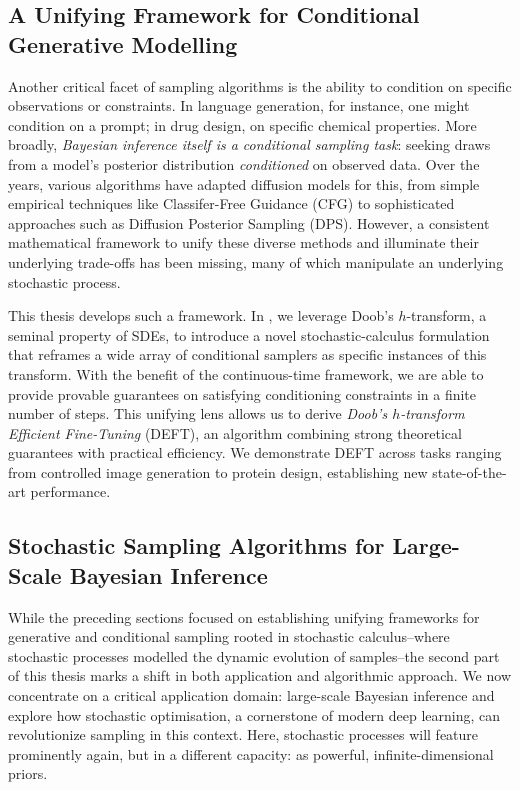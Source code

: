 \subsection{A Unifying Framework for Conditional Generative Modelling}

Another critical facet of sampling algorithms is the ability to condition on specific observations or constraints. In language generation, for instance, one might condition on a prompt; in drug design, on specific chemical properties. More broadly, \emph{Bayesian inference itself is a conditional sampling task}: seeking draws from a model's posterior distribution \emph{conditioned} on observed data. Over the years, various algorithms have adapted diffusion models for this, from simple empirical techniques like Classifer-Free Guidance (CFG) to sophisticated approaches such as Diffusion Posterior Sampling (DPS). However, a consistent mathematical framework to unify these diverse methods and illuminate their underlying trade-offs has been missing, many of which manipulate an underlying stochastic process.

This thesis develops such a framework. In , we leverage Doob’s \(h\)-transform, a seminal property of SDEs, to introduce a novel stochastic-calculus formulation that reframes a wide array of conditional samplers as specific instances of this transform. With the benefit of the continuous-time framework, we are able to provide provable guarantees on satisfying conditioning constraints in a finite number of steps. This unifying lens allows us to derive \emph{Doob’s \(h\)-transform Efficient Fine-Tuning} (DEFT), an algorithm combining strong theoretical guarantees with practical efficiency. We demonstrate DEFT across tasks ranging from controlled image generation to protein design, establishing new state-of-the-art performance.

\subsection{Stochastic Sampling Algorithms for Large-Scale Bayesian Inference}

While the preceding sections focused on establishing unifying frameworks for generative and conditional sampling rooted in stochastic calculus--where stochastic processes modelled the dynamic evolution of samples--the second part of this thesis marks a shift in both application and algorithmic approach. We now concentrate on a critical application domain: large-scale Bayesian inference and explore how stochastic optimisation, a cornerstone of modern deep learning, can revolutionize sampling in this context. Here, stochastic processes will feature prominently again, but in a different capacity: as powerful, infinite-dimensional priors.

